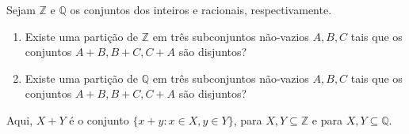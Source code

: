 Sejam $\mathbb{Z}$ e $\mathbb{Q}$ os conjuntos dos inteiros e racionais, respectivamente.

\begin{enumerate}[label = (\alph*)]
	\item Existe uma partição de $\mathbb{Z}$ em três subconjuntos não-vazios $A,B,C$ tais que os conjuntos $A+B, B+C, C+A$ são disjuntos?
	\item Existe uma partição de $\mathbb{Q}$ em três subconjuntos não-vazios $A,B,C$ tais que os conjuntos $A+B, B+C, C+A$ são disjuntos?
\end{enumerate}

Aqui, $X+Y$ é o conjunto $\{ x+y : x \in X, y \in Y \}$, para $X, Y \subseteq \mathbb{Z}$ e para $X, Y \subseteq \mathbb{Q}$.
